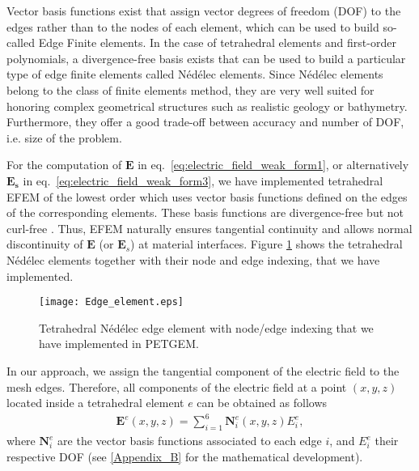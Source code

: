 \documentclass[review]{elsarticle}
\begin{document}
Vector basis functions exist that assign vector degrees of freedom (DOF) to the edges rather than to the nodes of each element, which can be used to build so-called Edge Finite elements. In the case of tetrahedral elements and first-order polynomials, a divergence-free basis exists that can be used to build a particular type of edge finite elements called N\'ed\'elec elements. Since N\'ed\'elec elements belong to the class of finite elements method, they are very well suited for honoring complex geometrical structures such as realistic geology or bathymetry. Furthermore, they offer a good trade-off between accuracy and number of DOF, i.e. size of the problem.

For the computation of $\mathbf{E}$ in eq.~\eqref{eq:electric_field_weak_form1}, or alternatively $\mathbf{E_s}$ in eq.~\eqref{eq:electric_field_weak_form3}, we have implemented tetrahedral EFEM of the lowest order which uses vector basis functions defined on the edges of the corresponding elements. These basis functions are divergence-free but not curl-free \citep{Jin2002}. Thus, EFEM naturally ensures tangential continuity and allows normal discontinuity of $\mathbf E$ (or $\mathbf E_{s}$) at material interfaces.  Figure \ref{fig:edge_element} shows the tetrahedral N\'ed\'elec elements together with their node and edge indexing, that we have implemented.
\begin{figure}[!htbp]
	\centering
	\texttt{[image: Edge\_element.eps]}
	\caption{Tetrahedral N\'ed\'elec edge element with node/edge indexing that we have implemented in PETGEM.}
	\label{fig:edge_element}
\end{figure}
In our approach, we assign the tangential component of the electric field to the mesh edges. Therefore, all components of the electric field at a point $(x, y, z)$ located inside a tetrahedral element $e$ can be obtained as follows
\begin{align}
\mathbf{E}^{e}(x, y, z) = \sum_{i=1}^{6} \mathbf N^{e}_{i}(x,y,z) E^{e}_{i},
\label{eq:field_components_edge_element}
\end{align}
where $\mathbf N^{e}_{i}$ are the vector basis functions associated to each edge $i$, and $E^{e}_{i}$ their respective DOF (see \ref{Appendix_B} for the mathematical development). 
\end{document}
